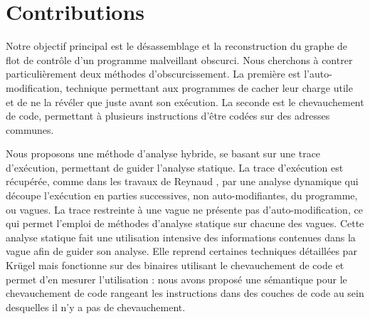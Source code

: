 \section*{Contributions}
% 
Notre objectif principal est le désassemblage et la reconstruction du graphe de flot de contrôle d'un programme malveillant obscurci.
Nous cherchons à contrer particulièrement deux méthodes d'obscurcissement. 
La première est l'auto-modification, technique permettant aux programmes de cacher leur charge utile et de ne la révéler que juste avant son exécution. La seconde est le chevauchement de code, permettant à plusieurs instructions d'être codées sur des adresses communes.

Nous proposons une méthode d'analyse hybride, se basant sur une trace d'exécution, permettant de guider l'analyse statique.
La trace d'exécution est récupérée, comme dans les travaux de Reynaud \cite{Reynaud2010}, par une analyse dynamique qui découpe l'exécution en parties successives, non auto-modifiantes, du programme, ou vagues.
La trace restreinte à une vague ne présente pas d'auto-modification, ce qui permet l'emploi de méthodes d'analyse statique sur chacune des vagues.
Cette analyse statique fait une utilisation intensive des informations contenues dans la vague afin de guider son analyse.
Elle reprend certaines techniques détaillées par Krügel \cite{KruegelRVV04} mais fonctionne sur des binaires utilisant le chevauchement de code et permet d'en mesurer l'utilisation : nous avons proposé une sémantique pour le chevauchement de code rangeant les instructions dans des couches de code au sein desquelles il n'y a pas de chevauchement.

